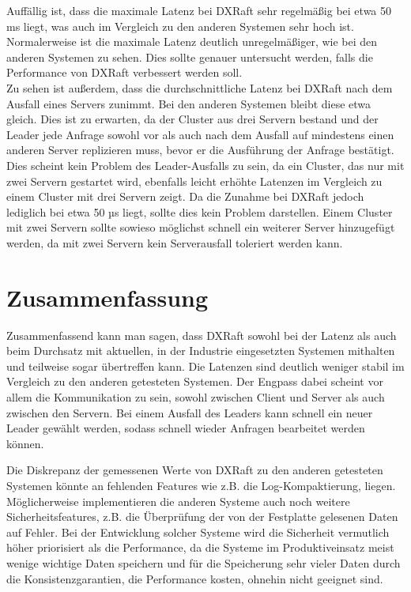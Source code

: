 Auffällig ist, dass die maximale Latenz bei DXRaft sehr regelmäßig bei etwa 50 ms liegt, was auch im Vergleich zu den anderen Systemen sehr hoch ist. Normalerweise ist die maximale Latenz deutlich unregelmäßiger, wie bei den anderen Systemen zu sehen. Dies sollte genauer untersucht werden, falls die Performance von DXRaft verbessert werden soll. \\
Zu sehen ist außerdem, dass die durchschnittliche Latenz bei DXRaft nach dem Ausfall eines Servers zunimmt. Bei den anderen Systemen bleibt diese etwa gleich. Dies ist zu erwarten, da der Cluster aus drei Servern bestand und der Leader jede Anfrage sowohl vor als auch nach dem Ausfall auf mindestens einen anderen Server replizieren muss, bevor er die Ausführung der Anfrage bestätigt. Dies scheint kein Problem des Leader-Ausfalls zu sein, da ein Cluster, das nur mit zwei Servern gestartet wird, ebenfalls leicht erhöhte Latenzen im Vergleich zu einem Cluster mit drei Servern zeigt. Da die Zunahme bei DXRaft jedoch lediglich bei etwa 50 µs liegt, sollte dies kein Problem darstellen. Einem Cluster mit zwei Servern sollte sowieso möglichst schnell ein weiterer Server hinzugefügt werden, da mit zwei Servern kein Serverausfall toleriert werden kann.


\section{Zusammenfassung}
\label{summary}

Zusammenfassend kann man sagen, dass DXRaft sowohl bei der Latenz als auch beim Durchsatz mit aktuellen, in der Industrie eingesetzten Systemen mithalten und teilweise sogar übertreffen kann. Die Latenzen sind deutlich weniger stabil im Vergleich zu den anderen getesteten Systemen. Der Engpass dabei scheint vor allem die Kommunikation zu sein, sowohl zwischen Client und Server als auch zwischen den Servern. Bei einem Ausfall des Leaders kann schnell ein neuer Leader gewählt werden, sodass schnell wieder Anfragen bearbeitet werden können. 

Die Diskrepanz der gemessenen Werte von DXRaft zu den anderen getesteten Systemen könnte an fehlenden Features wie z.B. die Log-Kompaktierung, liegen. Möglicherweise implementieren die anderen Systeme auch noch weitere Sicherheitsfeatures, z.B. die Überprüfung der von der Festplatte gelesenen Daten auf Fehler. Bei der Entwicklung solcher Systeme wird die Sicherheit vermutlich höher priorisiert als die Performance, da die Systeme im Produktiveinsatz meist wenige wichtige Daten speichern und für die Speicherung sehr vieler Daten durch die Konsistenzgarantien, die Performance kosten, ohnehin nicht geeignet sind.


